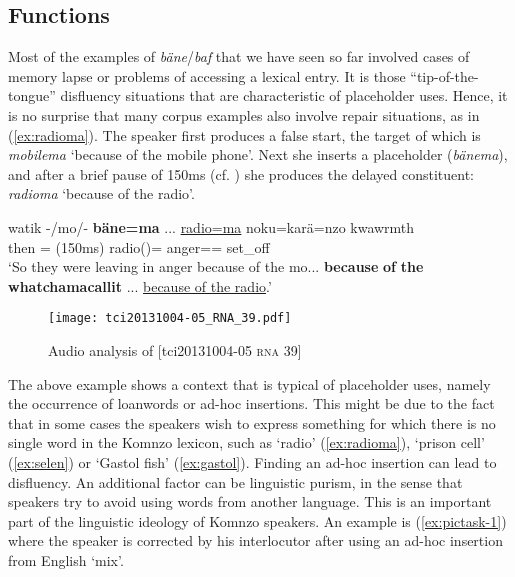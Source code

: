\documentclass[output=paper,colorlinks,citecolor=brown]{langscibook}
\begin{document}
\subsection{Functions}\label{sec:doehler:banefunc}

Most of the examples of \textit{bäne}/\textit{baf} that we have seen so far involved cases of memory lapse or problems of accessing a lexical entry. It is those ``tip-of-the-tongue'' disfluency situations that are characteristic of placeholder uses. Hence, it is no surprise that many corpus examples also involve repair situations, as in (\ref{ex:radioma}). The speaker first produces a false start, the target of which is \textit{mobilema} `because of the mobile phone'. Next she inserts a placeholder (\textit{bänema}), and after a brief pause of 150ms (cf. ) she produces the delayed constituent: \textit{radioma} `because of the radio'.

\ea \label{ex:radioma}
    \gll watik -/mo/- \textbf{bäne=ma} ... \uline{radio=ma} noku=karä=nzo kwawrmth\\
    then  = (150ms) radio()= anger== set\_off\\
    \glt `So they were leaving in anger because of the mo... \textbf{because} \textbf{of} \textbf{the} \textbf{whatchamacallit} ... \uline{because of the radio}.' 
\z

\begin{figure}
    \texttt{[image: tci20131004-05\_RNA\_39.pdf]}
    \caption{Audio analysis of [tci20131004-05 \textsc{rna} 39]}
    \label{fig:doehler:radioma}
\end{figure}

The above example shows a context that is typical of placeholder uses, namely the occurrence of loanwords or ad-hoc insertions. This might be due to the fact that in some cases the speakers wish to express something for which there is no single word in the Komnzo lexicon, such as `radio' (\ref{ex:radioma}), `prison cell' (\ref{ex:selen}) or `Gastol fish' (\ref{ex:gastol}). Finding an ad-hoc insertion can lead to disfluency. An additional factor can be linguistic purism, in the sense that speakers try to avoid using words from another language. This is an important part of the linguistic ideology of Komnzo speakers. An example is (\ref{ex:pictask-1}) where the speaker is corrected by his interlocutor after using an ad-hoc insertion from English `mix'.
\end{document}

